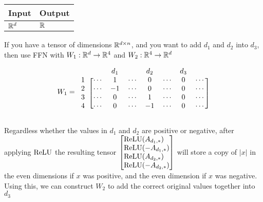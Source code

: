     \begin{tabular}{|p{1.5cm}|p{1.5cm}|}
        \hline
        \rowcolor{orange!20} %
        \textbf{Input} & \textbf{Output} \\
        \hline
        $\mathbb{R}^d$ & $\mathbb{R}$ \\
        \hline
    \end{tabular}

If you have a tensor of dimensions $\mathbb{R}^{d\times n}$, and you want to add 
$d_1$ and $d_2$ into $d_3$, then use FFN with $W_1:\mathbb{R}^d\to \mathbb{R}^4$ and $W_2:\mathbb{R}^4\to \mathbb{R}^d$

    \begin{equation*}
        W_1=
        \begin{blockarray}{cccccccc}
            & & d_1 & & d_2 & & d_3 & \\
            \begin{block}{c[ccccccc]}
                    1& \cdots & 1 & \cdots & 0 & \cdots & 0 & \cdots \\
                    2& \cdots & -1 & \cdots & 0 & \cdots & 0 & \cdots \\
                    3& \cdots & 0 & \cdots & 1 & \cdots & 0 & \cdots \\
                    4& \cdots & 0 & \cdots & -1 & \cdots & 0 & \cdots \\
            \end{block}
        \end{blockarray}
    \end{equation*}

    Regardless whether the values in $d_1$ and $d_2$ are positive or negative, after applying $\text{ReLU}$ the resulting tensor $\begin{bmatrix}
        \ReLU(A_{d_1,*})\phantom- \\
        \ReLU(-A_{d_1,*})\\
        \ReLU(A_{d_2,*})\phantom- \\
        \ReLU(-A_{d_2,*})\\
    \end{bmatrix}$ will store a copy of $|x|$ in the even dimensions if $x$ was positive, and the even dimension if $x$ was negative. Using this, we can construct $W_2$ to add the correct original values together into $d_3$
    
